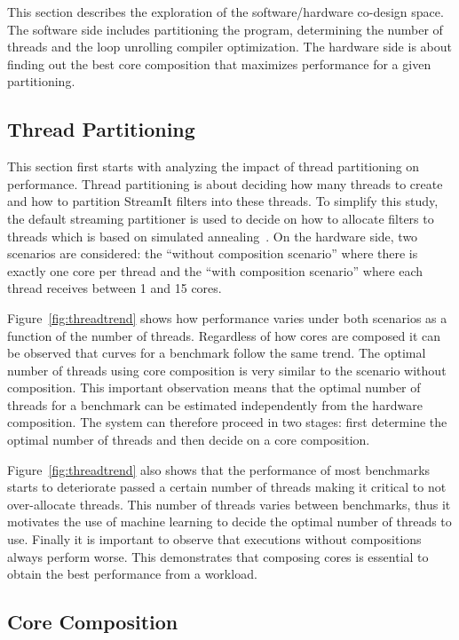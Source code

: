 This section describes the exploration of the software/hardware co-design space.
The software side includes partitioning the program, determining the number of threads and the loop unrolling compiler optimization.
The hardware side is about finding out the best core composition that maximizes performance for a given partitioning.

\subsection{Thread Partitioning}

This section first starts with analyzing the impact of thread partitioning on performance.
Thread partitioning is about deciding how many threads to create and how to partition StreamIt filters into these threads.
To simplify this study, the default streaming partitioner is used to decide on how to allocate filters to threads which is based on simulated annealing~\cite{simulatedAnnealing1983}.
On the hardware side, two scenarios are considered: the ``without composition scenario'' where there is exactly one core per thread and the ``with composition scenario'' where each thread receives between 1 and 15 cores.

Figure~\ref{fig:threadtrend} shows how performance varies under both scenarios as a function of the number of threads.
Regardless of how cores are composed it can be observed that curves for a benchmark follow the same trend.
The optimal number of threads using core composition is very similar to the scenario without composition.
This important observation means that the optimal number of threads for a benchmark can be estimated independently from the hardware composition.
The system can therefore proceed in two stages: first determine the optimal number of threads and then decide on a core composition.

Figure~\ref{fig:threadtrend} also shows that the performance of most benchmarks starts to deteriorate passed a certain number of threads making it critical to not over-allocate threads.
This number of threads varies between benchmarks, thus it motivates the use of machine learning to decide the optimal number of threads to use.
Finally it is important to observe that executions without compositions always perform worse.
This demonstrates that composing cores is essential to obtain the best performance from a workload.


\subsection{Core Composition}

